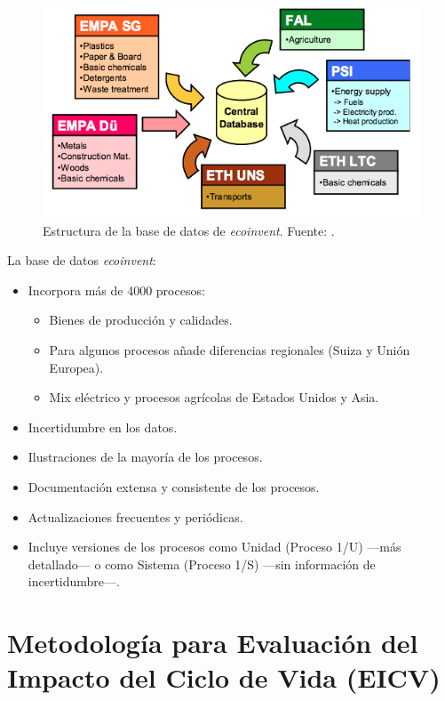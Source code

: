 \begin{figure}[!htb]
\centering
\includegraphics[width=13cm]{img/bbddecoinvent.png}
\caption[Estructura de la base de datos de \textit{ecoinvent}.]{Estructura de la base de datos de \textit{ecoinvent}. Fuente: \protect\cite{mgoedkoop2}.}
\label{fig:bbddecoinvent}
\end{figure}

La base de datos \textit{ecoinvent}:
\begin{itemize}
  \item Incorpora más de 4000 procesos:
  \begin{itemize}
    \item Bienes de producción y calidades.
    \item Para algunos procesos añade diferencias regionales (Suiza y Unión Europea).
    \item Mix eléctrico y procesos agrícolas de Estados Unidos y Asia.
  \end{itemize}
  \item Incertidumbre en los datos.
  \item Ilustraciones de la mayoría de los procesos.
  \item Documentación extensa y consistente de los procesos.
  \item Actualizaciones frecuentes y periódicas.
  \item Incluye versiones de los procesos como Unidad (Proceso 1/U) —más detallado— o como Sistema (Proceso 1/S) —sin información de incertidumbre—.
\end{itemize}

\section{Metodología para Evaluación del Impacto del Ciclo de Vida (EICV)}\label{sec:metodologiaeicv}

